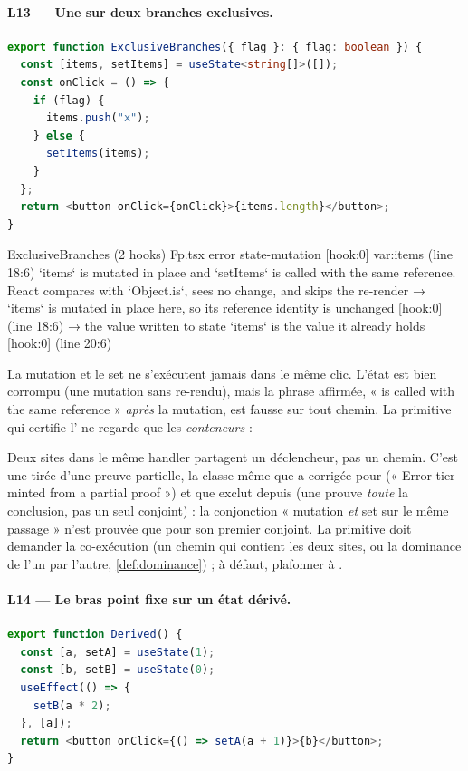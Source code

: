 \paragraph{L13 --- Une \Error{} sur deux branches exclusives.}
\begin{lstlisting}[language=TypeScript,caption={\file{/tmp/r27/fp/Fp.tsx}, composant \code{ExclusiveBranches}}]
export function ExclusiveBranches({ flag }: { flag: boolean }) {
  const [items, setItems] = useState<string[]>([]);
  const onClick = () => {
    if (flag) {
      items.push("x");
    } else {
      setItems(items);
    }
  };
  return <button onClick={onClick}>{items.length}</button>;
}
\end{lstlisting}

\begin{sortie}
  ExclusiveBranches  (2 hooks)  Fp.tsx
    error  state-mutation  [hook:0]  var:items  (line 18:6)  `items` is mutated in place and `setItems` is called with the same reference. React compares with `Object.is`, sees no change, and skips the re-render
       → `items` is mutated in place here, so its reference identity is unchanged [hook:0] (line 18:6)
       → the value written to state `items` is the value it already holds [hook:0] (line 20:6)
\end{sortie}

La mutation et le set ne s'exécutent jamais dans le même clic. L'état est bien corrompu (une mutation sans re-rendu), mais la phrase affirmée, «  is called with the same reference » \emph{après} la mutation, est fausse sur tout chemin. La primitive qui certifie l'\Error{} ne regarde que les \emph{conteneurs} :


Deux sites dans le même handler partagent un déclencheur, pas un chemin. C'est une \Error{} tirée d'une preuve partielle, la classe même que  a corrigée pour  (« Error tier minted from a partial proof ») et que  exclut depuis (une \Error{} prouve \emph{toute} la conclusion, pas un seul conjoint) : la conjonction « mutation \emph{et} set sur le même passage » n'est prouvée que pour son premier conjoint. La primitive doit demander la co-exécution (un chemin qui contient les deux sites, ou la dominance de l'un par l'autre, \cref{def:dominance}) ; à défaut, plafonner à \Warning{}.

\paragraph{L14 --- Le bras point fixe sur un état dérivé.}
\begin{lstlisting}[language=TypeScript,caption={\file{/tmp/r27/fp/Fp.tsx}, composant \code{Derived}}]
export function Derived() {
  const [a, setA] = useState(1);
  const [b, setB] = useState(0);
  useEffect(() => {
    setB(a * 2);
  }, [a]);
  return <button onClick={() => setA(a + 1)}>{b}</button>;
}
\end{lstlisting}

